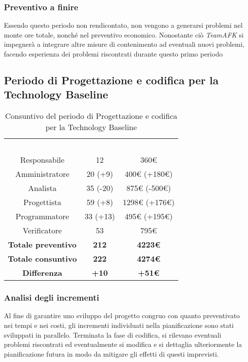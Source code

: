 \subsubsection{Preventivo a finire}
Essendo questo periodo non rendicontato, non vengono a generarsi problemi nel monte ore totale, nonché nel preventivo economico. Nonostante ciò \textit{TeamAFK} si impegnerà a integrare altre misure di contenimento ad eventuali nuovi problemi, facendo esperienza dei problemi riscontrati durante questo primo periodo

\subsection{Periodo di Progettazione e codifica per la Technology Baseline}

\begin{table}[H]
\centering\renewcommand{\arraystretch}{1.5}
\caption{Consuntivo del periodo di Progettazione e codifica per la Technology Baseline}
\vspace{0.2cm}
\begin{tabular}{ c c c }
\rowcolor{redafk}
\textcolor{white}{\textbf{Ruolo}} & \textcolor{white}{\textbf{Ore}} &
\textcolor{white}{\textbf{Costo}}  \\
Responsabile 	& 12 & 360€ \\
Amministratore 	& 20 (+9) 	& 400€ (+180€) \\
Analista 		& 35 (-20) 	& 875€ (-500€) \\
Progettista		& 59 (+8) 	& 1298€ (+176€)\\
Programmatore	& 33 (+13) 	& 495€ (+195€)\\
Verificatore 	& 53 & 795€ \\
\textbf{Totale preventivo} & \textbf{212} & \textbf{4223€}  \\
\textbf{Totale consuntivo} & \textbf{222} & \textbf{4274€}  \\
\rowcolor{lastrowcolor}
\textbf{Differenza} & \textbf{+10} & \textbf{+51€}  \\
\end{tabular}
\end{table}

\subsubsection{Analisi degli incrementi}
Al fine di garantire uno sviluppo del progetto congruo con quanto preventivato
nei tempi e nei costi, gli incrementi individuati nella pianificazione sono stati sviluppati in parallelo. Terminata la fase di codifica, si rilevano eventuali problemi riscontrati ed eventualmente si modifica e si dettaglia ulteriormente la pianificazione futura in modo da mitigare gli effetti di questi imprevisti.

